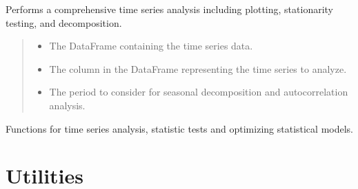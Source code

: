 \documentclass[letterpaper,10pt,english]{sphinxmanual}
\begin{document}
\begin{fulllineitems}
\label{\detokenize{docs/time_series_analysis:time_series_analysis.time_s_analysis}}
\pysigstartsignatures
{}
\pysigstopsignatures
\sphinxAtStartPar
Performs a comprehensive time series analysis including plotting, stationarity testing, and decomposition.
\begin{quote}\begin{description}
\begin{itemize}
\item {} 
\sphinxAtStartPar
{} \textendash{} The DataFrame containing the time series data.

\item {} 
\sphinxAtStartPar
{} \textendash{} The column in the DataFrame representing the time series to analyze.

\item {} 
\sphinxAtStartPar
{} \textendash{} The period to consider for seasonal decomposition and autocorrelation analysis.

\end{itemize}

\end{description}\end{quote}

\end{fulllineitems}


\sphinxAtStartPar
Functions for time series analysis, statistic tests and optimizing statistical models.

\sphinxstepscope


\section{Utilities}
\label{\detokenize{docs/utilities:module-utilities}}\label{\detokenize{docs/utilities:utilities}}\label{\detokenize{docs/utilities::doc}}
\end{document}
